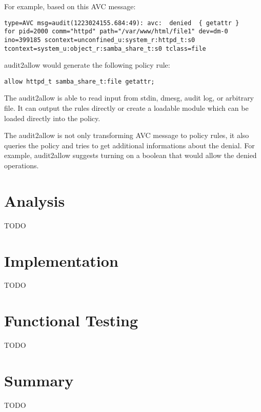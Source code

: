 For example, based on this AVC message:
\begin{lstlisting}
type=AVC msg=audit(1223024155.684:49): avc:  denied  { getattr }
for pid=2000 comm="httpd" path="/var/www/html/file1" dev=dm-0
ino=399185 scontext=unconfined_u:system_r:httpd_t:s0
tcontext=system_u:object_r:samba_share_t:s0 tclass=file
\end{lstlisting}
audit2allow would generate the following policy rule:
\begin{lstlisting}
allow httpd_t samba_share_t:file getattr;
\end{lstlisting}

The audit2allow is able to read input from stdin, dmesg, audit log, or arbitrary
file. It can output the rules directly or create a loadable module which can be
loaded directly into the policy.

The audit2allow is not only transforming AVC message to policy rules, it also
queries the policy and tries to get additional informations about the denial.
For example, audit2allow suggests turning on a boolean that would allow the
denied operations.

\chapter{Analysis}
TODO

\chapter{Implementation}
TODO

\chapter{Functional Testing}
TODO

\chapter{Summary}
TODO
